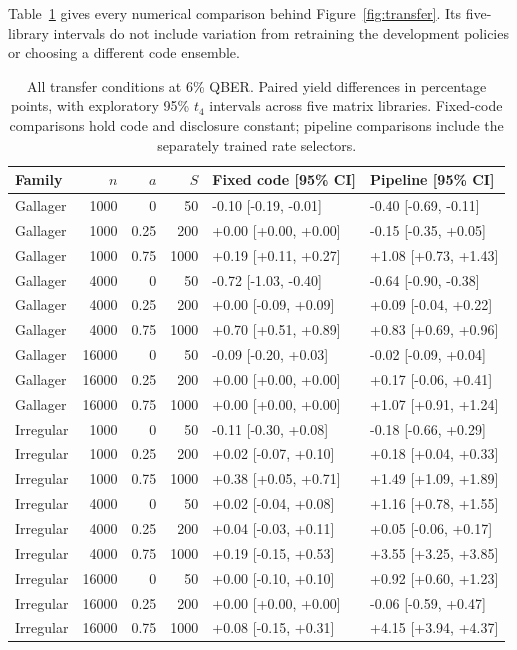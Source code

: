 Table~\ref{tab:transferall} gives every numerical comparison behind Figure~\ref{fig:transfer}.
Its five-library intervals do not include variation from retraining the development
policies or choosing a different code ensemble.

\begin{table}[htbp]
\centering
\small\setlength{\tabcolsep}{4pt}
\caption{All transfer conditions at 6\% QBER. Paired yield differences in percentage points, with exploratory 95\% $t_4$ intervals across five matrix libraries. Fixed-code comparisons hold code and disclosure constant; pipeline comparisons include the separately trained rate selectors.}
\label{tab:transferall}
\begin{tabular}{@{}lrrrll@{}}
\toprule
Family & $n$ & $a$ & $S$ & Fixed code [95\% CI] & Pipeline [95\% CI] \\
\midrule
Gallager & 1000 & 0 & 50 & -0.10 [-0.19, -0.01] & -0.40 [-0.69, -0.11] \\
Gallager & 1000 & 0.25 & 200 & +0.00 [+0.00, +0.00] & -0.15 [-0.35, +0.05] \\
Gallager & 1000 & 0.75 & 1000 & +0.19 [+0.11, +0.27] & +1.08 [+0.73, +1.43] \\
Gallager & 4000 & 0 & 50 & -0.72 [-1.03, -0.40] & -0.64 [-0.90, -0.38] \\
Gallager & 4000 & 0.25 & 200 & +0.00 [-0.09, +0.09] & +0.09 [-0.04, +0.22] \\
Gallager & 4000 & 0.75 & 1000 & +0.70 [+0.51, +0.89] & +0.83 [+0.69, +0.96] \\
Gallager & 16000 & 0 & 50 & -0.09 [-0.20, +0.03] & -0.02 [-0.09, +0.04] \\
Gallager & 16000 & 0.25 & 200 & +0.00 [+0.00, +0.00] & +0.17 [-0.06, +0.41] \\
Gallager & 16000 & 0.75 & 1000 & +0.00 [+0.00, +0.00] & +1.07 [+0.91, +1.24] \\
Irregular & 1000 & 0 & 50 & -0.11 [-0.30, +0.08] & -0.18 [-0.66, +0.29] \\
Irregular & 1000 & 0.25 & 200 & +0.02 [-0.07, +0.10] & +0.18 [+0.04, +0.33] \\
Irregular & 1000 & 0.75 & 1000 & +0.38 [+0.05, +0.71] & +1.49 [+1.09, +1.89] \\
Irregular & 4000 & 0 & 50 & +0.02 [-0.04, +0.08] & +1.16 [+0.78, +1.55] \\
Irregular & 4000 & 0.25 & 200 & +0.04 [-0.03, +0.11] & +0.05 [-0.06, +0.17] \\
Irregular & 4000 & 0.75 & 1000 & +0.19 [-0.15, +0.53] & +3.55 [+3.25, +3.85] \\
Irregular & 16000 & 0 & 50 & +0.00 [-0.10, +0.10] & +0.92 [+0.60, +1.23] \\
Irregular & 16000 & 0.25 & 200 & +0.00 [+0.00, +0.00] & -0.06 [-0.59, +0.47] \\
Irregular & 16000 & 0.75 & 1000 & +0.08 [-0.15, +0.31] & +4.15 [+3.94, +4.37] \\
\bottomrule
\end{tabular}
\end{table}
